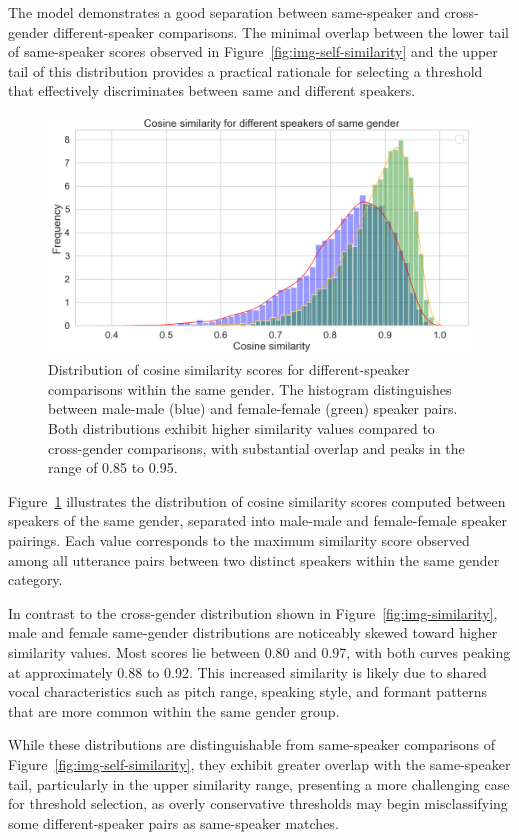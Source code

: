 \documentclass[conference]{IEEEtran}
\begin{document}
The model demonstrates a good separation between same-speaker and cross-gender different-speaker comparisons. The minimal overlap between the lower tail of same-speaker scores observed in Figure~\ref{fig:img-self-similarity} and the upper tail of this distribution provides a practical rationale for selecting a threshold that effectively discriminates between same and different speakers.

\begin{figure}[H]
	\centering
	\includegraphics[width=0.7\linewidth]{img/img-similarity-same-gender}
	\caption{Distribution of cosine similarity scores for different-speaker comparisons within the same gender. The histogram distinguishes between male-male (blue) and female-female (green) speaker pairs. Both distributions exhibit higher similarity values compared to cross-gender comparisons, with substantial overlap and peaks in the range of 0.85 to 0.95.}	
	\label{fig:img-similarity-same-gender}
\end{figure}

Figure~\ref{fig:img-similarity-same-gender} illustrates the distribution of cosine similarity scores computed between speakers of the same gender, separated into male-male and female-female speaker pairings. Each value corresponds to the maximum similarity score observed among all utterance pairs between two distinct speakers within the same gender category.

In contrast to the cross-gender distribution shown in Figure~\ref{fig:img-similarity}, male and female same-gender distributions are noticeably skewed toward higher similarity values. Most scores lie between 0.80 and 0.97, with both curves peaking at approximately 0.88 to 0.92. This increased similarity is likely due to shared vocal characteristics such as pitch range, speaking style, and formant patterns that are more common within the same gender group.

While these distributions are distinguishable from same-speaker comparisons of Figure~\ref{fig:img-self-similarity}, they exhibit greater overlap with the same-speaker tail, particularly in the upper similarity range, presenting a more challenging case for threshold selection, as overly conservative thresholds may begin misclassifying some different-speaker pairs as same-speaker matches.
\end{document}
